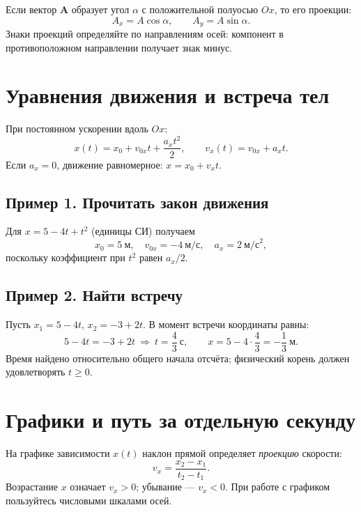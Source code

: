 \documentclass[a4paper,12pt]{article}
\newcommand{\vct}[1]{\boldsymbol{#1}}
\begin{document}
Если вектор $\vct A$ образует угол $\alpha$ с положительной полуосью $Ox$, то его проекции:
\[
 A_x=A\cos\alpha,\qquad A_y=A\sin\alpha.
\]
Знаки проекций определяйте по направлениям осей: компонент в противоположном направлении получает знак минус.

\section{Уравнения движения и встреча тел}
При постоянном ускорении вдоль $Ox$:
\[
 x(t)=x_0+v_{0x}t+\frac{a_xt^2}{2},\qquad v_x(t)=v_{0x}+a_xt.
\]
Если $a_x=0$, движение равномерное: $x=x_0+v_xt$.

\subsection{Пример 1. Прочитать закон движения}
Для $x=5-4t+t^2$ (единицы СИ) получаем
\[
 x_0=5\ \text{м},\quad v_{0x}=-4\ \text{м/с},\quad a_x=2\ \text{м/с}^2,
\]
поскольку коэффициент при $t^2$ равен $a_x/2$.

\subsection{Пример 2. Найти встречу}
Пусть $x_1=5-4t$, $x_2=-3+2t$. В момент встречи координаты равны:
\[
 5-4t=-3+2t\ \Longrightarrow\ t=\frac43\ \text{с},\qquad
 x=5-4\cdot\frac43=-\frac13\ \text{м}.
\]
Время найдено относительно общего начала отсчёта; физический корень должен удовлетворять $t\ge0$.

\section{Графики и путь за отдельную секунду}
На графике зависимости $x(t)$ наклон прямой определяет \textit{проекцию} скорости:
\[
 v_x=\frac{x_2-x_1}{t_2-t_1}.
\]
Возрастание $x$ означает $v_x>0$; убывание --- $v_x<0$. При работе с графиком пользуйтесь числовыми шкалами осей.

\begin{center}
\end{center}
\end{document}
